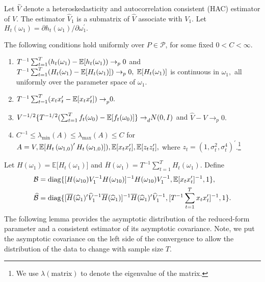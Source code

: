Let $\widehat{V}$ denote a heteroskedasticity and autocorrelation consistent (HAC) estimator of $V$. The estimator $\widehat{V}_{1}$ is a submatrix of $\widehat{V}$ associate with $V_{1}.$ Let $H_{t}(\omega _{1})=\partial h_{t}(\omega _{1})/\partial \omega _{1}^{\prime }.$

\begin{assumpR}
    \label{assump:R}
    The following conditions hold uniformly over $P\in \mathcal{P}$, for some fixed $0 < C < \infty$.
    
    \begin{enumerate}
        \item $T^{-1}\sum_{t=1}^{T}(h_{t}(\omega_{1})-\operatorname{\mathbb{E}}[ h_{t}(\omega _{1}))\rightarrow _{p}0$ and $T^{-1}\sum_{t=1}^{T}(H_{t}(\omega _{1})-\operatorname{\mathbb{E}}[H_{t}(\omega _{1})])\rightarrow _{p}0,$ $\operatorname{\mathbb{E}}[H_{t}(\omega _{1})]$ is continuous in $\omega _{1},$ all uniformly over the parameter space of $\omega _{1}$.
        \item $T^{-1}\sum_{t=1}^{T}(x_{t}x_{t}^{\prime }-\operatorname{\mathbb{E}}[ x_{t}x_{t}^{\prime }{])\rightarrow }_{p}0.$
        \item $V^{-1/2}\{T^{-1/2}(\sum_{t=1}^{T}f_{t}(\omega _{0})-\operatorname{\mathbb{E}}[f_{t}(\omega _{0}){]\} \rightarrow }_{d}N(0,I)$ and $\widehat{V} -V\rightarrow _{p}0.$
        \item $C^{-1}\leq \lambda_{\min }(A)\leq \lambda_{\max }(A)\leq C$ for $A=V,\operatorname{\mathbb{E}}[H_{t}\left( \omega _{1,0}\right) ^{\prime }H_{t}\left( \omega _{1,0}\right) ]),\operatorname{\mathbb{E}}[x_{t}x_{t}^{\prime }],\operatorname{\mathbb{E}}[ z_{t}z_{t}^{\prime }],$ where $z_{t}=(1,\sigma _{t}^{2},\sigma _{t}^{4})^{\prime}$.\footnote{We use $\lambda(\mathrm{matrix})$ to denote the eigenvalue of the matrix.}
    \end{enumerate}
\end{assumpR}


Let $H(\omega _{1})=\mathbb{E[}H_{t}(\omega _{1})]$ and $\overline{H}(\omega _{1})=T^{-1}\sum_{t=1}^{T}H_{t}(\omega _{1}).$ Define
%
\begin{align}
%
    \mathcal{B} &= \diag\{[H(\omega _{10})V_{1}^{-1}H(\omega _{10})]^{-1}H(\omega _{10})V_{1}^{-1},\mathbb{E[}x_{t}x_{t}^{\prime }]^{-1},1\},  \notag \\
%
    \widehat{\mathcal{B}} &= \diag\{[\overline{H}(\widehat{\omega }_{1})^{\prime } \widehat{V}_{1}^{-1}\overline{H}(\widehat{\omega }_{1})]^{-1}\overline{H}( \widehat{\omega }_{1})^{\prime }\widehat{V}_{1}^{-1},[T^{-1}
\sum_{t=1}^{T}x_{t}x_{t}^{\prime }]^{-1},1\}.  
%
    \label{Fhat}
\end{align}
%
The following lemma provides the asymptotic distribution of the reduced-form parameter and a consistent estimator of its asymptotic covariance. Note, we put the asymptotic covariance on the left side of the convergence to allow the distribution of the data to change with sample size $T$.

